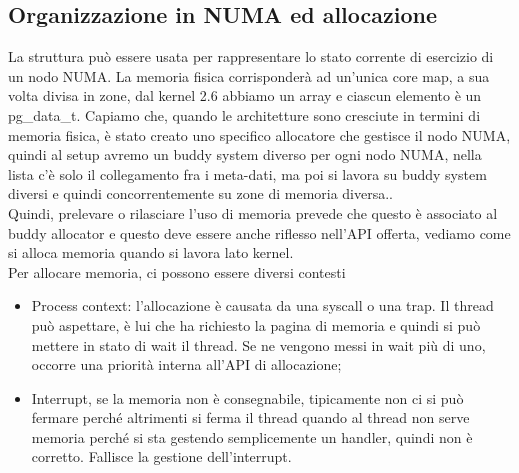 \documentclass[12pt, oneside]{extbook}
\begin{document}
\subsection{Organizzazione in NUMA ed allocazione}
La struttura può essere usata per rappresentare lo stato corrente di esercizio di un nodo NUMA. La memoria fisica corrisponderà ad un'unica core map, a sua volta divisa in zone, dal kernel 2.6 abbiamo un array e ciascun elemento è un \textsf{pg\_data\_t}. Capiamo che, quando le architetture sono cresciute in termini di memoria fisica, è stato creato uno specifico allocatore che gestisce il nodo NUMA, quindi al setup avremo un buddy system diverso per ogni nodo NUMA, nella lista c'è solo il collegamento fra i meta-dati, ma poi si lavora su buddy system diversi e quindi concorrentemente su zone di memoria diversa..\\ Quindi, prelevare o rilasciare l'uso di memoria prevede che questo è associato al buddy allocator e questo deve essere anche riflesso nell'API offerta, vediamo come si alloca memoria quando si lavora lato kernel.\\ Per allocare memoria, ci possono essere diversi contesti
\begin{itemize}
\item Process context: l'allocazione è causata da una syscall o una trap. Il thread può aspettare, è lui che ha richiesto la pagina di memoria e quindi si può mettere in stato di wait il thread. Se ne vengono messi in wait più di uno, occorre una priorità interna all'API di allocazione;
\item Interrupt, se la memoria non è consegnabile, tipicamente non ci si può fermare perché altrimenti si ferma il thread quando al thread non serve memoria perché si sta gestendo semplicemente un handler, quindi non è corretto. Fallisce la gestione dell'interrupt. 
\end{itemize} 
\end{document}
